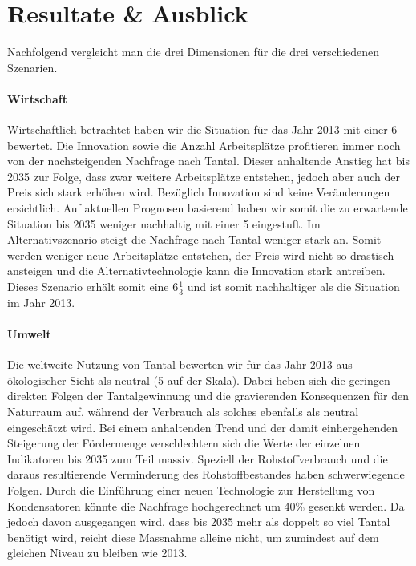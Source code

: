 \section{Resultate \& Ausblick}\label{sec:conflict}

Nachfolgend vergleicht man die drei Dimensionen für die drei verschiedenen Szenarien.

\paragraph{Wirtschaft}
Wirtschaftlich betrachtet haben wir die Situation für das Jahr 2013 mit einer 6
bewertet. Die Innovation sowie die Anzahl Arbeitsplätze profitieren immer noch von
der nachsteigenden Nachfrage nach Tantal. Dieser anhaltende Anstieg hat bis 2035 zur Folge,
dass zwar weitere Arbeitsplätze entstehen, jedoch aber auch der Preis sich stark erhöhen
wird. Bezüglich Innovation sind keine Veränderungen ersichtlich. Auf aktuellen Prognosen
basierend haben wir somit die zu erwartende Situation bis 2035 weniger nachhaltig mit einer 5 eingestuft.
Im Alternativszenario steigt die Nachfrage nach Tantal weniger stark an. Somit werden
weniger neue Arbeitsplätze entstehen, der Preis wird nicht so drastisch ansteigen
und die Alternativtechnologie kann die Innovation stark antreiben. Dieses Szenario
erhält somit eine 6\(\frac{1}{3}\) und ist somit nachhaltiger als die Situation
im Jahr 2013.

\paragraph{Umwelt}
Die weltweite Nutzung von Tantal bewerten wir für das Jahr 2013 aus ökologischer
Sicht als neutral (5 auf der Skala). Dabei heben sich die geringen direkten
Folgen der Tantalgewinnung und die gravierenden Konsequenzen für den Naturraum
auf, während der Verbrauch als solches ebenfalls als neutral eingeschätzt wird.
Bei einem anhaltenden Trend und der damit einhergehenden Steigerung der
Fördermenge verschlechtern sich die Werte der einzelnen Indikatoren bis 2035 zum
Teil massiv. Speziell der Rohstoffverbrauch und die daraus resultierende
Verminderung des Rohstoffbestandes haben schwerwiegende Folgen. Durch die
Einführung einer neuen Technologie zur Herstellung von Kondensatoren könnte die
Nachfrage hochgerechnet um 40\% gesenkt werden. Da jedoch davon ausgegangen
wird, dass bis 2035 mehr als doppelt so viel Tantal benötigt wird, reicht
diese Massnahme alleine nicht, um zumindest auf dem gleichen Niveau zu bleiben
wie 2013. 

